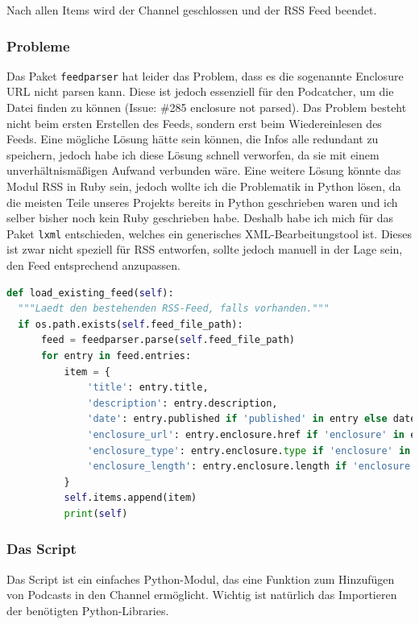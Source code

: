\documentclass{article}
\begin{document}
Nach allen Items wird der Channel geschlossen und der RSS Feed beendet.

\subsubsection{Probleme}
Das Paket \texttt{feedparser} \cite{feedparser} hat leider das Problem, dass es die sogenannte Enclosure URL nicht parsen kann. Diese ist jedoch essenziell für den Podcatcher, um die Datei finden zu können (Issue: \#285 enclosure not parsed). Das Problem besteht nicht beim ersten Erstellen des Feeds, sondern erst beim Wiedereinlesen des Feeds. Eine mögliche Lösung hätte sein können, die Infos alle redundant zu speichern, jedoch habe ich diese Lösung schnell verworfen, da sie mit einem unverhältnismäßigen Aufwand verbunden wäre. Eine weitere Lösung könnte das Modul RSS in Ruby sein, jedoch wollte ich die Problematik in Python lösen, da die meisten Teile unseres Projekts bereits in Python geschrieben waren und ich selber bisher noch kein Ruby geschrieben habe.
Deshalb habe ich mich für das Paket \texttt{lxml} \cite{lxml} entschieden, welches ein generisches XML-Bearbeitungstool ist. Dieses ist zwar nicht speziell für RSS entworfen, sollte jedoch manuell in der Lage sein, den Feed entsprechend anzupassen.

\begin{lstlisting}[language=Python, caption=Feedparser Bug]
def load_existing_feed(self):
  """Laedt den bestehenden RSS-Feed, falls vorhanden."""
  if os.path.exists(self.feed_file_path):
      feed = feedparser.parse(self.feed_file_path)
      for entry in feed.entries:
          item = {
              'title': entry.title,
              'description': entry.description,
              'date': entry.published if 'published' in entry else datetime.now().isoformat(),
              'enclosure_url': entry.enclosure.href if 'enclosure' in entry else None,
              'enclosure_type': entry.enclosure.type if 'enclosure' in entry else None,
              'enclosure_length': entry.enclosure.length if 'enclosure' in entry else None
          }
          self.items.append(item)
          print(self)
\end{lstlisting}

\subsubsection{Das Script}
Das Script ist ein einfaches Python-Modul, das eine Funktion zum Hinzufügen von Podcasts in den Channel ermöglicht. Wichtig ist natürlich das Importieren der benötigten Python-Libraries.
\end{document}
